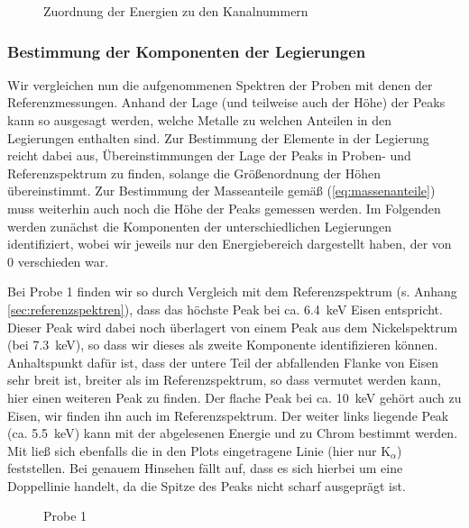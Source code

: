 \documentclass[11pt, a4paper]{article}
\begin{document}
\begin{figure}[h]
\centering
\resizebox{\columnwidth}{!}{%
}
\caption{Zuordnung der Energien zu den Kanalnummern}
\label{fig:energieeichung}
\end{figure}

\subsubsection{Bestimmung der Komponenten der Legierungen}

Wir vergleichen nun die aufgenommenen Spektren der Proben mit denen der Referenzmessungen.
Anhand der Lage (und teilweise auch der Höhe) der Peaks kann so ausgesagt werden, welche Metalle zu welchen Anteilen in den Legierungen enthalten sind.
Zur Bestimmung der Elemente in der Legierung reicht dabei aus, Übereinstimmungen der Lage der Peaks in Proben- und Referenzspektrum zu finden, solange die Größenordnung der Höhen übereinstimmt.
Zur Bestimmung der Masseanteile gemäß (\ref{eq:massenanteile}) muss weiterhin auch noch die Höhe der Peaks gemessen werden.
Im Folgenden werden zunächst die Komponenten der unterschiedlichen Legierungen identifiziert, wobei wir jeweils nur den Energiebereich dargestellt haben, der von $0$ verschieden war.

Bei Probe 1 finden wir so durch Vergleich mit dem Referenzspektrum (s. Anhang \ref{sec:referenzspektren}), dass das höchste Peak bei ca. \SI{6.4}{\kilo\electronvolt} Eisen entspricht.
Dieser Peak wird dabei noch überlagert von einem Peak aus dem Nickelspektrum (bei \SI{7.3}{\kilo\electronvolt}), so dass wir dieses als zweite Komponente identifizieren können.
Anhaltspunkt dafür ist, dass der untere Teil der abfallenden Flanke von Eisen sehr breit ist, breiter als im Referenzspektrum, so dass vermutet werden kann, hier einen weiteren Peak zu finden.
Der flache Peak bei ca. \SI{10}{\kilo\electronvolt} gehört auch zu Eisen, wir finden ihn auch im Referenzspektrum.
Der weiter links liegende Peak (ca. \SI{5.5}{\kilo\electronvolt}) kann mit der abgelesenen Energie und \cite{booklet} zu Chrom bestimmt werden.
Mit \cite{booklet} ließ sich ebenfalls die in den Plots eingetragene Linie (hier nur K$_{\alpha}$) feststellen.
Bei genauem Hinsehen fällt auf, dass es sich hierbei um eine Doppellinie handelt, da die Spitze des Peaks nicht scharf ausgeprägt ist.

\begin{figure}[!h]
\centering

\caption{Probe 1}
\label{fig:probe1}
\end{figure}
\end{document}
